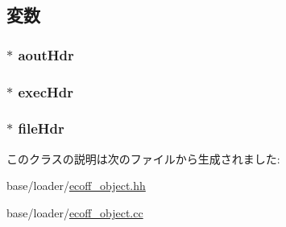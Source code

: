 \subsection{変数}
\hypertarget{classEcoffObject_a472dfe6c2f3be923540cd3e090062f5d}{
\subsubsection[{aoutHdr}]{$\ast$ {\bf aoutHdr}}}
\label{classEcoffObject_a472dfe6c2f3be923540cd3e090062f5d}
\hypertarget{classEcoffObject_a0447939fdd24d55b8641d1f4c90ca28b}{
\subsubsection[{execHdr}]{$\ast$ {\bf execHdr}}}
\label{classEcoffObject_a0447939fdd24d55b8641d1f4c90ca28b}
\hypertarget{classEcoffObject_a6f58ada2e9fe9c6fd1bff41680fcb88e}{
\subsubsection[{fileHdr}]{$\ast$ {\bf fileHdr}}}
\label{classEcoffObject_a6f58ada2e9fe9c6fd1bff41680fcb88e}


このクラスの説明は次のファイルから生成されました:\begin{DoxyCompactItemize}
\item 
base/loader/\hyperlink{ecoff__object_8hh}{ecoff\_\-object.hh}\item 
base/loader/\hyperlink{ecoff__object_8cc}{ecoff\_\-object.cc}\end{DoxyCompactItemize}
